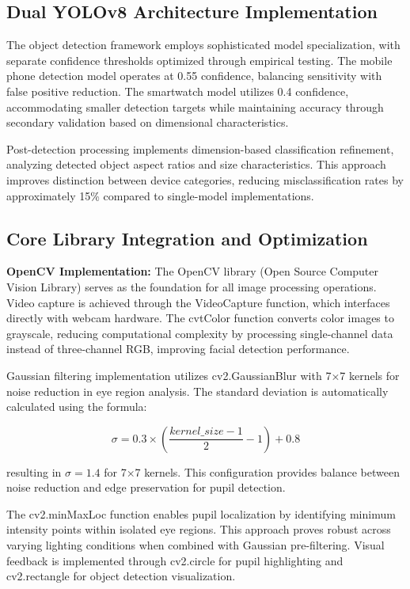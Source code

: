 \documentclass[conference]{IEEEtran}
\begin{document}
\subsection{Dual YOLOv8 Architecture Implementation}

The object detection framework employs sophisticated model specialization, with separate 
confidence thresholds optimized through empirical testing\cite{ultralytics}. The mobile 
phone detection model operates at 0.55 confidence, balancing sensitivity with false positive 
reduction. The smartwatch model utilizes 0.4 confidence, accommodating smaller detection 
targets while maintaining accuracy through secondary validation based on dimensional characteristics.

Post-detection processing implements dimension-based classification refinement, analyzing 
detected object aspect ratios and size characteristics. This approach improves distinction 
between device categories, reducing misclassification rates by approximately 15\% compared 
to single-model implementations\cite{redmon2018yolov3}.

\subsection{Core Library Integration and Optimization}

\textbf{OpenCV Implementation:} The OpenCV library (Open Source Computer Vision Library) 
serves as the foundation for all image processing operations\cite{hasan2021face}. Video 
capture is achieved through the VideoCapture function, which interfaces directly 
with webcam hardware. The cvtColor function converts color images to grayscale, 
reducing computational complexity by processing single-channel data instead of three-channel 
RGB, improving facial detection performance.

Gaussian filtering implementation utilizes cv2.GaussianBlur with 7×7 kernels 
for noise reduction in eye region analysis. The standard deviation is automatically calculated 
using the formula:

\begin{equation}
\sigma = 0.3 \times \left(\frac{kernel\_size - 1}{2} - 1\right) + 0.8
\end{equation}

resulting in $\sigma = 1.4$ for 7×7 kernels. This configuration provides balance 
between noise reduction and edge preservation for pupil detection.

The cv2.minMaxLoc function enables pupil localization by identifying 
minimum intensity points within isolated eye regions. This approach proves robust across 
varying lighting conditions when combined with Gaussian pre-filtering. Visual feedback 
is implemented through cv2.circle for pupil highlighting and cv2.rectangle 
for object detection visualization.
\end{document}
